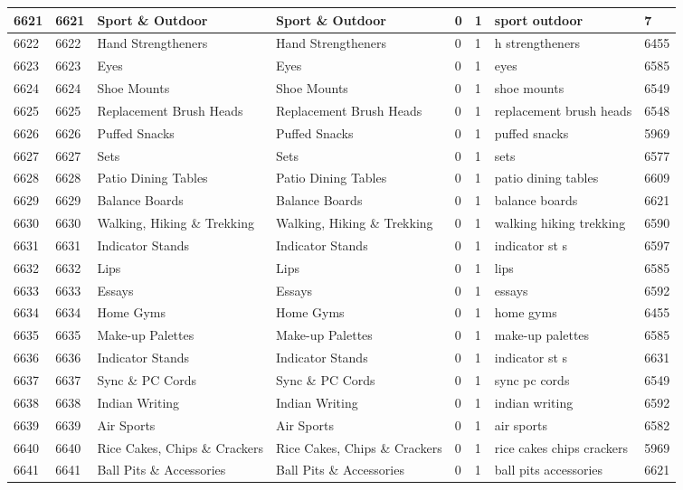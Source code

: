 \begin{longtable}{|l|l|l|l|l|l|l|l|}
6621 & 6621 & Sport \& Outdoor & Sport \& Outdoor & 0 & 1 & sport outdoor & 7 \\ \hline 
6622 & 6622 & Hand Strengtheners & Hand Strengtheners & 0 & 1 & h strengtheners & 6455 \\ \hline 
6623 & 6623 & Eyes & Eyes & 0 & 1 & eyes & 6585 \\ \hline 
6624 & 6624 & Shoe Mounts & Shoe Mounts & 0 & 1 & shoe mounts & 6549 \\ \hline 
6625 & 6625 & Replacement Brush Heads & Replacement Brush Heads & 0 & 1 & replacement brush heads & 6548 \\ \hline 
6626 & 6626 & Puffed Snacks & Puffed Snacks & 0 & 1 & puffed snacks & 5969 \\ \hline 
6627 & 6627 & Sets & Sets & 0 & 1 & sets & 6577 \\ \hline 
6628 & 6628 & Patio Dining Tables & Patio Dining Tables & 0 & 1 & patio dining tables & 6609 \\ \hline 
6629 & 6629 & Balance Boards & Balance Boards & 0 & 1 & balance boards & 6621 \\ \hline 
6630 & 6630 & Walking, Hiking \& Trekking & Walking, Hiking \& Trekking & 0 & 1 & walking hiking trekking & 6590 \\ \hline 
6631 & 6631 & Indicator Stands & Indicator Stands & 0 & 1 & indicator st s & 6597 \\ \hline 
6632 & 6632 & Lips & Lips & 0 & 1 & lips & 6585 \\ \hline 
6633 & 6633 & Essays & Essays & 0 & 1 & essays & 6592 \\ \hline 
6634 & 6634 & Home Gyms & Home Gyms & 0 & 1 & home gyms & 6455 \\ \hline 
6635 & 6635 & Make-up Palettes & Make-up Palettes & 0 & 1 & make-up palettes & 6585 \\ \hline 
6636 & 6636 & Indicator Stands & Indicator Stands & 0 & 1 & indicator st s & 6631 \\ \hline 
6637 & 6637 & Sync \& PC Cords & Sync \& PC Cords & 0 & 1 & sync pc cords & 6549 \\ \hline 
6638 & 6638 & Indian Writing & Indian Writing & 0 & 1 & indian writing & 6592 \\ \hline 
6639 & 6639 & Air Sports & Air Sports & 0 & 1 & air sports & 6582 \\ \hline 
6640 & 6640 & Rice Cakes, Chips \& Crackers & Rice Cakes, Chips \& Crackers & 0 & 1 & rice cakes chips crackers & 5969 \\ \hline 
6641 & 6641 & Ball Pits \& Accessories & Ball Pits \& Accessories & 0 & 1 & ball pits accessories & 6621 \\ \hline 

\end{longtable}
